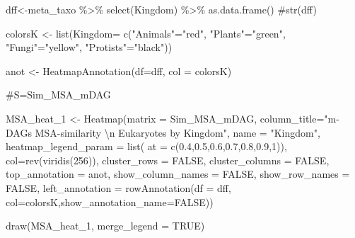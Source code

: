 \documentclass[
  letterpaper,
  DIV=11,
  numbers=noendperiod]{scrreprt}
\newenvironment{Shaded}{\begin{snugshade}}{\end{snugshade}}
\newcommand{\AttributeTok}[1]{\textcolor[rgb]{0.40,0.45,0.13}{#1}}
\newcommand{\CommentTok}[1]{\textcolor[rgb]{0.37,0.37,0.37}{#1}}
\newcommand{\ConstantTok}[1]{\textcolor[rgb]{0.56,0.35,0.01}{#1}}
\newcommand{\DecValTok}[1]{\textcolor[rgb]{0.68,0.00,0.00}{#1}}
\newcommand{\FloatTok}[1]{\textcolor[rgb]{0.68,0.00,0.00}{#1}}
\newcommand{\FunctionTok}[1]{\textcolor[rgb]{0.28,0.35,0.67}{#1}}
\newcommand{\NormalTok}[1]{\textcolor[rgb]{0.00,0.23,0.31}{#1}}
\newcommand{\OtherTok}[1]{\textcolor[rgb]{0.00,0.23,0.31}{#1}}
\newcommand{\SpecialCharTok}[1]{\textcolor[rgb]{0.37,0.37,0.37}{#1}}
\newcommand{\StringTok}[1]{\textcolor[rgb]{0.13,0.47,0.30}{#1}}
\begin{document}
\begin{Shaded}
\begin{Highlighting}[]
\NormalTok{dff}\OtherTok{\textless{}{-}}\NormalTok{meta\_taxo }\SpecialCharTok{\%\textgreater{}\%} \FunctionTok{select}\NormalTok{(Kingdom)  }\SpecialCharTok{\%\textgreater{}\%} \FunctionTok{as.data.frame}\NormalTok{()}
\CommentTok{\#str(dff)}

\NormalTok{colorsK }\OtherTok{\textless{}{-}} \FunctionTok{list}\NormalTok{(}\AttributeTok{Kingdom=} \FunctionTok{c}\NormalTok{(}\StringTok{"Animals"}\OtherTok{=}\StringTok{"red"}\NormalTok{,}
                           \StringTok{"Plants"}\OtherTok{=}\StringTok{"green"}\NormalTok{,}
                           \StringTok{"Fungi"}\OtherTok{=}\StringTok{"yellow"}\NormalTok{,}
                           \StringTok{"Protists"}\OtherTok{=}\StringTok{"black"}\NormalTok{))}

\NormalTok{anot }\OtherTok{\textless{}{-}} \FunctionTok{HeatmapAnnotation}\NormalTok{(}\AttributeTok{df=}\NormalTok{dff, }\AttributeTok{col =}\NormalTok{ colorsK)}

\CommentTok{\#S=Sim\_MSA\_mDAG}

\NormalTok{MSA\_heat\_1 }\OtherTok{\textless{}{-}} \FunctionTok{Heatmap}\NormalTok{(}\AttributeTok{matrix =}\NormalTok{ Sim\_MSA\_mDAG, }
                          \AttributeTok{column\_title=}\StringTok{"m{-}DAGs MSA{-}similarity }\SpecialCharTok{\textbackslash{}n}\StringTok{  Eukaryotes by Kingdom"}\NormalTok{,}
            \AttributeTok{name =} \StringTok{"Kingdom"}\NormalTok{,}
            \AttributeTok{heatmap\_legend\_param =} \FunctionTok{list}\NormalTok{(}
    \AttributeTok{at =} \FunctionTok{c}\NormalTok{(}\FloatTok{0.4}\NormalTok{,}\FloatTok{0.5}\NormalTok{,}\FloatTok{0.6}\NormalTok{,}\FloatTok{0.7}\NormalTok{,}\FloatTok{0.8}\NormalTok{,}\FloatTok{0.9}\NormalTok{,}\DecValTok{1}\NormalTok{)),}
        \AttributeTok{col=}\FunctionTok{rev}\NormalTok{(}\FunctionTok{viridis}\NormalTok{(}\DecValTok{256}\NormalTok{)),}
        \AttributeTok{cluster\_rows =} \ConstantTok{FALSE}\NormalTok{,}
        \AttributeTok{cluster\_columns =} \ConstantTok{FALSE}\NormalTok{,}
        \AttributeTok{top\_annotation =}\NormalTok{ anot,}
        \AttributeTok{show\_column\_names =} \ConstantTok{FALSE}\NormalTok{, }
        \AttributeTok{show\_row\_names =} \ConstantTok{FALSE}\NormalTok{,}
        \AttributeTok{left\_annotation =} \FunctionTok{rowAnnotation}\NormalTok{(}\AttributeTok{df =}\NormalTok{ dff,                                    }\AttributeTok{col=}\NormalTok{colorsK,}\AttributeTok{show\_annotation\_name=}\ConstantTok{FALSE}\NormalTok{))}
  
\FunctionTok{draw}\NormalTok{(MSA\_heat\_1, }\AttributeTok{merge\_legend =} \ConstantTok{TRUE}\NormalTok{)}
\end{Highlighting}
\end{Shaded}
\end{document}
